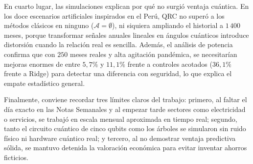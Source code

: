 En cuarto lugar, las simulaciones explican por qué no surgió ventaja cuántica. En los doce escenarios artificiales inspirados en el Perú, QRC no superó a los métodos clásicos en ninguno (\(\mathcal{A}=\emptyset\)), ni siquiera ampliando el historial a \(1\,400\) meses, porque transformar señales anuales lineales en ángulos cuánticos introduce distorsión cuando la relación real es sencilla. Además, el análisis de potencia confirma que con \(250\) meses reales y alta agitación pandémica, se necesitarían mejoras enormes de entre \(5{,}7\%\) y \(11{,}1\%\) frente a controles acotados (\(36{,}1\%\) frente a Ridge) para detectar una diferencia con seguridad, lo que explica el empate estadístico general.

Finalmente, conviene recordar tres límites claros del trabajo: primero, al faltar el día exacto en las Notas Semanales y al empezar tarde sectores como electricidad o servicios, se trabajó en escala mensual aproximada en tiempo real; segundo, tanto el circuito cuántico de cinco qubits como los árboles se simularon sin ruido físico ni hardware cuántico real; y tercero, al no demostrar ventaja predictiva sólida, se mantuvo detenida la valoración económica para evitar inventar ahorros ficticios.
